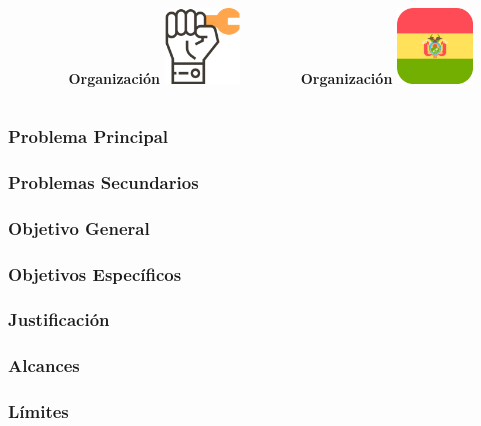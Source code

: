 \documentclass[xcolor=dvipsnames]{beamer}
\begin{document}
\begin{frame}
\begin{columns}
\begin{column}{0.3\textwidth}
      \end{column}
      \begin{column}{0.3\textwidth}
        \centering\textbf{\textcolor{color3}{Organización}\vspace{3mm}}
        \vspace{10mm}
        \includegraphics[width=20mm]{005-union.pdf}
      \end{column}
      \begin{column}{0.3\textwidth}
        \centering\textbf{\textcolor{color3}{Organización}\vspace{3mm}}
        \vspace{10mm}
        \includegraphics[width=20mm]{bolivia.pdf}
      \end{column}
    \end{columns}
\end{frame}

\begin{frame}
    \frametitle{Problema Principal}
\end{frame}

\begin{frame}
    \frametitle{Problemas Secundarios}
\end{frame}

\begin{frame}
    \frametitle{Objetivo General}
\end{frame}

\begin{frame}
    \frametitle{Objetivos Específicos}
\end{frame}

\begin{frame}
    \frametitle{Justificación}
\end{frame}

\begin{frame}
    \frametitle{Alcances}
\end{frame}

\begin{frame}
    \frametitle{Límites}
\end{frame}
\end{document}

